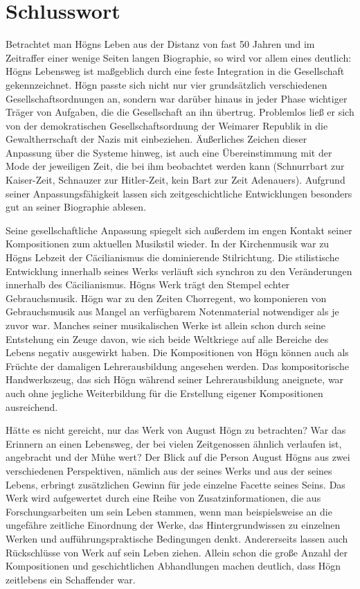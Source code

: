 \section{Schlusswort}

Betrachtet man Högns Leben aus der
Distanz von fast 50 Jahren und im Zeitraffer einer wenige Seiten langen
Biographie, so wird vor allem eines deutlich: Högns Lebensweg ist
maßgeblich durch eine feste Integration in die Gesellschaft
gekennzeichnet. Högn passte sich nicht nur vier grundsätzlich
verschiedenen Gesellschaftsordnungen an, sondern war darüber hinaus in
jeder Phase wichtiger Träger von Aufgaben, die die Gesellschaft an ihn
übertrug. Problemlos ließ er sich von der demokratischen
Gesellschaftsordnung der Weimarer Republik in die Gewaltherrschaft der
Nazis mit einbeziehen. Äußerliches Zeichen dieser Anpassung über die
Systeme hinweg, ist auch eine Übereinstimmung mit der Mode der
jeweiligen Zeit, die bei ihm beobachtet werden kann (Schnurrbart zur
Kaiser-Zeit, Schnauzer zur Hitler-Zeit, kein Bart zur Zeit Adenauers).
Aufgrund seiner Anpassungsfähigkeit lassen sich zeitgeschichtliche
Entwicklungen besonders gut an seiner Biographie ablesen.

Seine gesellschaftliche Anpassung spiegelt sich außerdem im engen
Kontakt seiner Kompositionen zum aktuellen Musikstil wieder. In der
Kirchenmusik war zu Högns Lebzeit der Cäcilianismus die dominierende
Stilrichtung. Die stilistische Entwicklung innerhalb seines Werks
verläuft sich synchron zu den Veränderungen innerhalb des
Cäcilianismus. Högns Werk trägt den Stempel echter Gebrauchsmusik. Högn
war zu den Zeiten Chorregent, wo komponieren von Gebrauchsmusik aus
Mangel an verfügbarem Notenmaterial notwendiger als je zuvor war.
Manches seiner musikalischen Werke ist allein schon durch seine
Entstehung ein Zeuge davon, wie sich beide Weltkriege auf alle Bereiche
des Lebens negativ ausgewirkt haben. Die Kompositionen von Högn können
auch als Früchte der damaligen Lehrerausbildung angesehen werden. Das
kompositorische Handwerkszeug, das sich Högn während seiner
Lehrerausbildung aneignete, war auch ohne jegliche Weiterbildung für
die Erstellung eigener Kompositionen ausreichend.

Hätte es nicht gereicht, nur das Werk von August Högn zu betrachten? War
das Erinnern an einen Lebensweg, der bei vielen Zeitgenossen ähnlich
verlaufen ist, angebracht und der Mühe wert? Der Blick auf die Person
August Högns aus zwei verschiedenen Perspektiven, nämlich aus der
seines Werks und aus der seines Lebens, erbringt zusätzlichen Gewinn
für jede einzelne Facette seines Seins. Das Werk wird aufgewertet durch
eine Reihe von Zusatzinformationen, die aus Forschungsarbeiten um sein
Leben stammen, wenn man beispielsweise an die ungefähre zeitliche
Einordnung der Werke, das Hintergrundwissen zu einzelnen Werken und
aufführungspraktische Bedingungen denkt. Andererseits lassen auch
Rückschlüsse von Werk auf sein Leben ziehen. Allein schon die große
Anzahl der Kompositionen und geschichtlichen Abhandlungen machen
deutlich, dass Högn zeitlebens ein Schaffender war.

